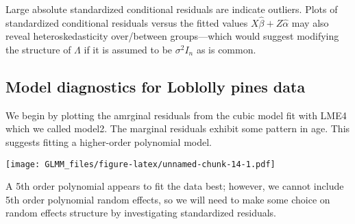 \documentclass[
]{book}
\newenvironment{Shaded}{\begin{snugshade}}{\end{snugshade}}
\newcommand{\AttributeTok}[1]{\textcolor[rgb]{0.77,0.63,0.00}{#1}}
\newcommand{\FunctionTok}[1]{\textcolor[rgb]{0.00,0.00,0.00}{#1}}
\newcommand{\NormalTok}[1]{#1}
\newcommand{\OtherTok}[1]{\textcolor[rgb]{0.56,0.35,0.01}{#1}}
\newcommand{\SpecialCharTok}[1]{\textcolor[rgb]{0.00,0.00,0.00}{#1}}
\newcommand{\StringTok}[1]{\textcolor[rgb]{0.31,0.60,0.02}{#1}}
\begin{document}
Large absolute standardized conditional residuals are indicate outliers. Plots of standardized conditional residuals versus the fitted values \(X\hat\beta + Z\hat\alpha\) may also reveal heteroskedasticity over/between groups---which would suggest modifying the structure of \(\Lambda\) if it is assumed to be \(\sigma^2 I_n\) as is common.

\hypertarget{model-diagnostics-for-loblolly-pines-data}{%
\subsection{Model diagnostics for Loblolly pines data}\label{model-diagnostics-for-loblolly-pines-data}}

We begin by plotting the amrginal residuals from the cubic model fit with LME4 which we called model2. The marginal residuals exhibit some pattern in age. This suggests fitting a higher-order polynomial model.

\begin{Shaded}
\end{Shaded}

\texttt{[image: GLMM\_files/figure-latex/unnamed-chunk-14-1.pdf]}

A 5th order polynomial appears to fit the data best; however, we cannot include 5th order polynomial random effects, so we will need to make some choice on random effects structure by investigating standardized residuals.
\end{document}
